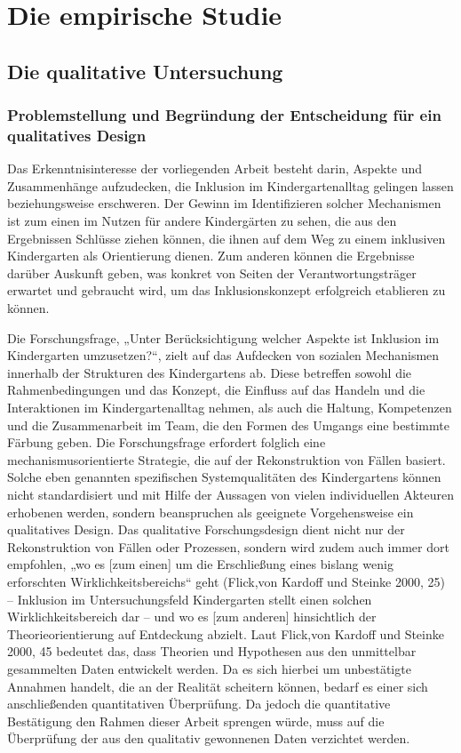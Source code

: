 \part{Die empirische Studie}
\chapter{Die qualitative Untersuchung}
\section{Problemstellung und Begründung der Entscheidung für ein qualitatives Design}
Das Erkenntnisinteresse der vorliegenden Arbeit besteht darin, Aspekte und Zusammenhänge aufzudecken, die Inklusion im Kindergartenalltag gelingen lassen beziehungsweise erschweren. Der Gewinn im Identifizieren solcher Mechanismen ist zum einen im Nutzen für andere Kindergärten zu sehen, die aus den Ergebnissen Schlüsse ziehen können, die ihnen auf dem Weg zu einem inklusiven Kindergarten als Orientierung dienen. Zum anderen können die Ergebnisse darüber Auskunft geben, was konkret von Seiten der Verantwortungsträger erwartet und gebraucht wird, um das Inklusionskonzept erfolgreich etablieren zu können.

Die Forschungsfrage, „Unter Berücksichtigung welcher Aspekte ist Inklusion im Kindergarten umzusetzen?“, zielt auf das Aufdecken von sozialen Mechanismen innerhalb der Strukturen des Kindergartens ab. Diese betreffen sowohl die Rahmenbedingungen und das Konzept, die  Einfluss auf das Handeln und die Interaktionen im Kindergartenalltag nehmen, als auch die Haltung, Kompetenzen und die Zusammenarbeit im Team, die den Formen des Umgangs eine bestimmte Färbung geben. Die Forschungsfrage erfordert folglich eine mechanismusorientierte Strategie, die auf der Rekonstruktion von Fällen basiert. Solche eben genannten spezifischen Systemqualitäten des Kindergartens können nicht standardisiert und mit Hilfe der Aussagen von vielen individuellen Akteuren erhobenen werden, sondern beanspruchen als geeignete Vorgehensweise ein  
qualitatives Design. Das qualitative Forschungsdesign dient nicht nur der Rekonstruktion von Fällen oder Prozessen, sondern wird zudem auch immer dort empfohlen, „wo es [zum einen] um die Erschließung eines bislang wenig erforschten Wirklichkeitsbereichs“ geht (Flick,von Kardoff und Steinke 2000, 25) -- Inklusion im Untersuchungsfeld Kindergarten stellt einen solchen Wirklichkeitsbereich dar -- und wo es [zum anderen] hinsichtlich der Theorieorientierung auf Entdeckung abzielt.
Laut Flick,von Kardoff und Steinke 2000, 45 bedeutet das, dass Theorien und Hypothesen aus den unmittelbar gesammelten Daten entwickelt werden. Da es sich hierbei um unbestätigte Annahmen handelt, die an der Realität scheitern können, bedarf es einer sich anschließenden  quantitativen Überprüfung. 
Da jedoch die quantitative Bestätigung den Rahmen dieser Arbeit sprengen würde, muss auf die Überprüfung der aus den qualitativ gewonnenen Daten verzichtet werden.

